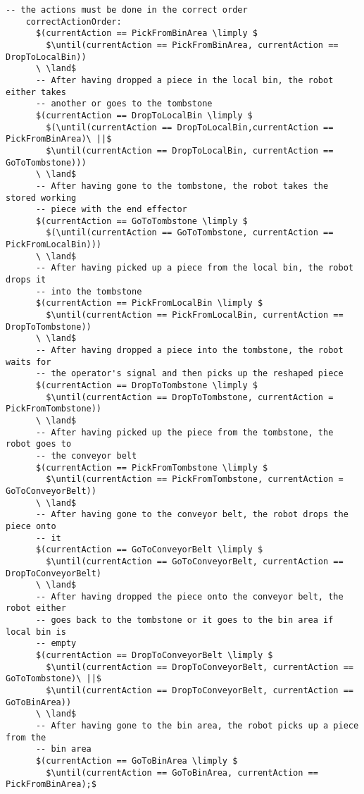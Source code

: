 \begin{lstlisting}[fontadjust, mathescape, frame=single]
    -- the actions must be done in the correct order
    correctActionOrder:
      $(currentAction == PickFromBinArea \limply $
        $\until(currentAction == PickFromBinArea, currentAction == DropToLocalBin))
      \ \land$
      -- After having dropped a piece in the local bin, the robot either takes 
      -- another or goes to the tombstone
      $(currentAction == DropToLocalBin \limply $
        $(\until(currentAction == DropToLocalBin,currentAction == PickFromBinArea)\ ||$
        $\until(currentAction == DropToLocalBin, currentAction == GoToTombstone)))
      \ \land$
      -- After having gone to the tombstone, the robot takes the stored working 
      -- piece with the end effector
      $(currentAction == GoToTombstone \limply $
        $(\until(currentAction == GoToTombstone, currentAction == PickFromLocalBin)))
      \ \land$
      -- After having picked up a piece from the local bin, the robot drops it 
      -- into the tombstone
      $(currentAction == PickFromLocalBin \limply $
        $\until(currentAction == PickFromLocalBin, currentAction == DropToTombstone))
      \ \land$
      -- After having dropped a piece into the tombstone, the robot waits for  
      -- the operator's signal and then picks up the reshaped piece
      $(currentAction == DropToTombstone \limply $ 
        $\until(currentAction == DropToTombstone, currentAction = PickFromTombstone))
      \ \land$
      -- After having picked up the piece from the tombstone, the robot goes to
      -- the conveyor belt
      $(currentAction == PickFromTombstone \limply $
        $\until(currentAction == PickFromTombstone, currentAction = GoToConveyorBelt))
      \ \land$
      -- After having gone to the conveyor belt, the robot drops the piece onto
      -- it
      $(currentAction == GoToConveyorBelt \limply $
        $\until(currentAction == GoToConveyorBelt, currentAction == DropToConveyorBelt)
      \ \land$
      -- After having dropped the piece onto the conveyor belt, the robot either 
      -- goes back to the tombstone or it goes to the bin area if local bin is 
      -- empty
      $(currentAction == DropToConveyorBelt \limply $
        $\until(currentAction == DropToConveyorBelt, currentAction == GoToTombstone)\ ||$
        $\until(currentAction == DropToConveyorBelt, currentAction == GoToBinArea))
      \ \land$
      -- After having gone to the bin area, the robot picks up a piece from the 
      -- bin area
      $(currentAction == GoToBinArea \limply $
        $\until(currentAction == GoToBinArea, currentAction == PickFromBinArea);$


\end{lstlisting}
